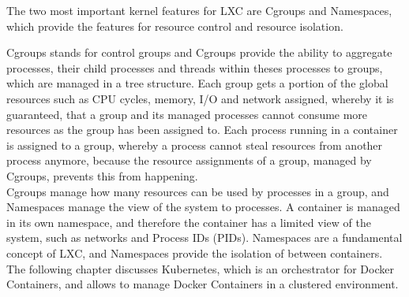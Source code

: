 The two most important kernel features for LXC are Cgroups and Namespaces, which provide the features for resource control and resource isolation. 

Cgroups stands for control groups and Cgroups provide the ability to aggregate processes, their child processes and threads within theses processes to groups, which are managed in a tree structure. Each group gets a portion of the global resources such as CPU cycles, memory, I/O and network assigned, whereby it is guaranteed, that a group and its managed processes cannot consume more resources as the group has been assigned to. Each process running in a container is assigned to a group, whereby a process cannot steal resources from another process anymore, because the resource assignments of a group, managed by Cgroups, prevents this from happening\cite{KernelCGroupsV12018, KernelCGroupV22015, IntelLXCHyperVisor2014}. \\

Cgroups manage how many resources can be used by processes in a group, and Namespaces manage the view of the system to processes. A container is managed in its own namespace, and therefore the container has a limited view of the system, such as networks and Process IDs (PIDs). Namespaces are a fundamental concept of LXC, and Namespaces provide the isolation of between containers\cite{LinuxNamespaces2018, IntelLXCHyperVisor2014}. \\

The following chapter discusses Kubernetes, which is an orchestrator for Docker Containers, and allows to manage Docker Containers in a clustered environment. 
 


